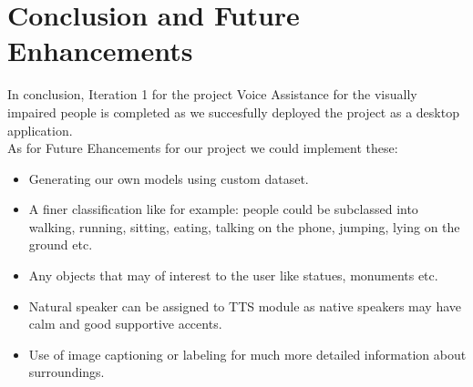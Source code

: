         \chapter{Conclusion and Future Enhancements}
        In conclusion, Iteration 1 for the project Voice Assistance for the visually impaired people is completed as we succesfully deployed the project as a desktop application.\\
        As for Future Ehancements for our project we could implement these:
        \begin{itemize}
                \item Generating our own models using custom dataset.
                \item A finer classification like for example: people could be subclassed into walking, running, sitting, eating, talking on the phone, jumping, lying on the ground etc.
                \item Any objects that may of interest to the user like statues, monuments etc. 
                \item Natural speaker can be assigned to TTS module as native speakers may have calm and good supportive accents.
                \item Use of image captioning or labeling for much more detailed information about surroundings.
        \end{itemize}
       
